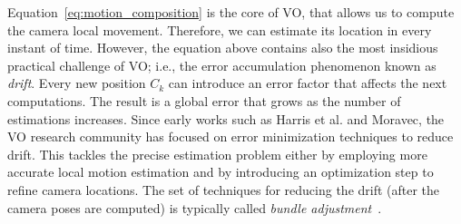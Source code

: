 Equation~\ref{eq:motion_composition} is the core of VO, that allows us to compute the camera local movement. Therefore, we can estimate its location in every instant of time. However, the equation above contains also the most insidious practical challenge of VO; i.e., the error accumulation phenomenon known as \emph{drift}.
Every new position $C_k$ can introduce an error factor that affects the next 
computations. The result is a global error that grows as the number of 
estimations increases.
%
Since early works such as Harris et al.\cite{harris19883d} and Moravec\cite{moravec1980obstacle}, the VO research community has focused on error minimization techniques to reduce drift.
This tackles the precise estimation problem either by employing more accurate
local motion estimation and by introducing an optimization step to refine 
camera locations.
The set of techniques for reducing the drift (after the camera poses are computed) is typically called \emph{bundle adjustment}~\cite{triggs1999bundle}.

